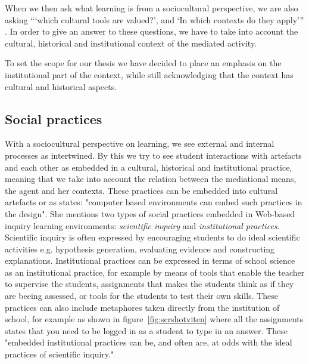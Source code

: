 When we then ask what learning is from a sociocultural perspective, we are also asking “‘which cultural tools are valued?’, and ‘In which contexts do they apply’” \citep{mifsud2010reconsidering}. In order to give an answer to these questions, we have to take into account the cultural, historical and institutional context of the mediated activity. 

To set the scope for our thesis we have decided to place an emphasis on the institutional part of the context, while still acknowledging that the context has cultural and historical aspects.  

\subsection{Social practices}
With a sociocultural perspective on learning, we see external and internal processes as intertwined. By this we try to see student interactions with artefacts and each other as embedded in a cultural, historical and institutional practice, meaning that we take into account the relation between the mediational means, the agent and her contexts. These practices can be embedded into cultural artefacts or as \citet{furberg2009socio} states: "computer based environments can embed such practices in the design". She mentions two types of social practices embedded in Web-based inquiry learning environments: \emph{scientific inquiry} and \emph{institutional practices}.  Scientific inquiry is often expressed by encouraging students to do ideal scientific activities e.g. hypothesis generation, evaluating evidence and constructing explanations. Institutional practices can be expressed in terms of school science as an institutional practice, for example by means of tools that enable the teacher to supervise the students, assignments that makes the students think as if they are beeing assessed, or tools for the students to test their own skills. These practices can also include metaphores taken directly from the institution of school, for example as shown in figure~\ref{fig:scrshotviten} where all the assignments states that you need to be logged in as a student to type in an answer. These "embedded institutional practices can be, and often are, at odds with the ideal practices of scientific inquiry." \citetext{\citealp{chinn2002epistemologically}, referenced in \citealp{furberg2009socio}}

